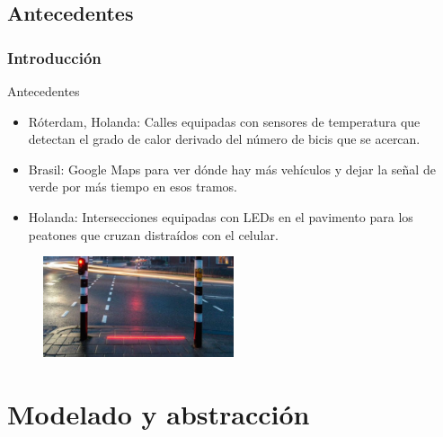 \begin{frame}
\begin{columns}[T]
\begin{column}{.40\textwidth}
               \end{column}
      \end{columns}
	\end{frame}

\subsection{Antecedentes}

\begin{frame}
\frametitle{Introducción}
\begin{block}{Antecedentes}
	\begin{itemize}
		\item Róterdam, Holanda: Calles equipadas con sensores de temperatura que detectan el grado de calor derivado del número de bicis que se acercan.
		\item Brasil: Google Maps para ver dónde hay más vehículos y dejar la señal de verde por más tiempo en esos tramos.
		\item Holanda: Intersecciones equipadas con LEDs en el pavimento para los peatones que cruzan distraídos con el celular.
	\end{itemize}

       \begin{figure}[htbp]
               \centering
               \includegraphics[width=0.5\textwidth]{diagramas/antecedente1.jpg}
       \end{figure}
\end{block}
\end{frame}

\section{Modelado y abstracción}

